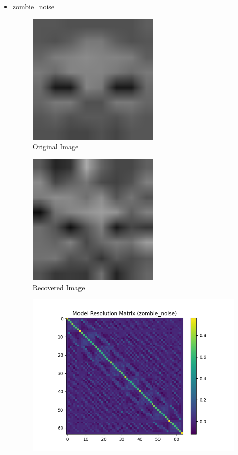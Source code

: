\documentclass{article}
\begin{document}
\begin{itemize}
        \item zombie\_noise
    \begin{figure}[h]
        \centering
        \includegraphics[width=0.6\textwidth]{images/greyscale/zombie.png}
        \caption{Original Image}
    \end{figure}
    \begin{figure}[h]
        \centering
        \includegraphics[width=0.6\textwidth]{images/outputs/noise/zombie_noise.png}
        \caption{Recovered Image}
    \end{figure}
    \begin{figure}[h]
        \centering
        \includegraphics[width=1\textwidth]{images/outputs/modelres/zombie_noise.png}

\end{figure}
\end{itemize}
\end{document}
